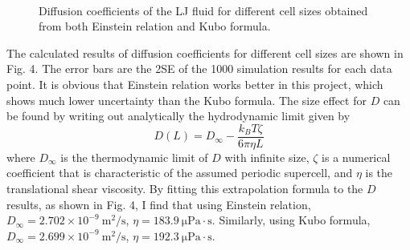 \documentclass{article}
\begin{document}
\begin{figure}
    \centering
    \\
    \caption{Diffusion coefficients of the LJ fluid for different cell sizes obtained from both Einstein relation and Kubo formula.}
\end{figure}
The calculated results of diffusion coefficients for different cell sizes are shown in Fig. 4.
The error bars are the 2SE of the 1000 simulation results for each data point. It is obvious that Einstein relation works better in this project, which shows much lower uncertainty than the Kubo formula. The size effect for $D$ can be found by writing out analytically the hydrodynamic limit given by
\begin{equation}
    D(L) = D_{\infty} - \frac{k_B T \zeta}{6 \pi \eta L}
\end{equation}
where $D_{\infty}$ is the thermodynamic limit of $D$ with infinite size, $\zeta$ is a numerical coefficient that is characteristic of the assumed periodic supercell, and $\eta$ is the translational shear viscosity. By fitting this extrapolation formula to the $D$ results, as shown in Fig. 4, I find that using Einstein relation, $D_{\infty} = 2.702 \times 10^{-9}\ \mathrm{m^2/s}$, $\eta = 183.9\ \mathrm{\mu Pa \cdot s}$. Similarly, using Kubo formula, $D_{\infty} = 2.699 \times 10^{-9}\ \mathrm{m^2/s}$, $\eta = 192.3\ \mathrm{\mu Pa \cdot s}$.
\end{document}

